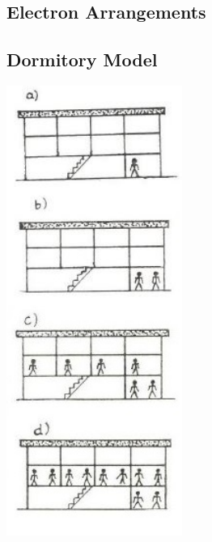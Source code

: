 \begin{multicols}{2}
\vfill
\columnbreak


\section*{Electron Arrangements} 


\subsection{Dormitory Model}

\begin{center}
\includegraphics[width=0.43\textwidth]{./img/source/dorm-arrangement.jpg}
\end{center}


\end{multicols}
